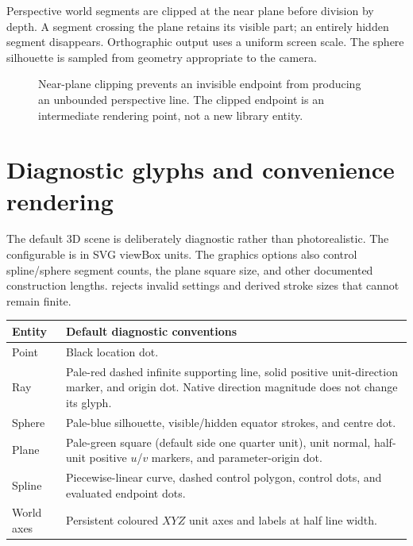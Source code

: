 Perspective world segments are clipped at the near plane before division by
depth. A segment crossing the plane retains its visible part; an entirely
hidden segment disappears. Orthographic output uses a uniform screen scale.
The sphere silhouette is sampled from geometry appropriate to the camera.

\begin{figure}[htbp]\centering
{}
\caption{Near-plane clipping prevents an invisible endpoint from producing
an unbounded perspective line. The clipped endpoint is an intermediate
rendering point, not a new library entity.}
\label{fig:near-clip}
\end{figure}

\section{Diagnostic glyphs and convenience rendering}
The default 3D scene is deliberately diagnostic rather than photorealistic.
The configurable  is in SVG viewBox units. The graphics options
also control spline/sphere segment counts, the plane square size, and other
documented construction lengths.  rejects invalid settings and
derived stroke sizes that cannot remain finite.

\begin{tabularx}{\linewidth}{@{}lY@{}}
\toprule
Entity & Default diagnostic conventions\\
\midrule
Point & Black location dot.\\
Ray & Pale-red dashed infinite supporting line, solid positive unit-direction
marker, and origin dot. Native direction magnitude does not change its glyph.\\
Sphere & Pale-blue silhouette, visible/hidden equator strokes, and centre dot.\\
Plane & Pale-green square (default side one quarter unit), unit normal,
half-unit positive $u$/$v$ markers, and parameter-origin dot.\\
Spline & Piecewise-linear curve, dashed control polygon, control dots, and
evaluated endpoint dots.\\
World axes & Persistent coloured $XYZ$ unit axes and labels at half line width.\\
\bottomrule
\end{tabularx}

